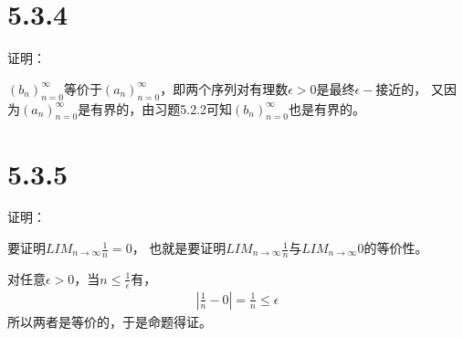 \documentclass{article}
\theoremstyle{mystyle}
\begin{document}
\section*{5.3.4}

证明：

$(b_n)_{n=0}^\infty$等价于$(a_n)_{n=0}^\infty$，即两个序列对有理数$\epsilon > 0$是最终$\epsilon -$接近的，
又因为$(a_n)_{n=0}^\infty$是有界的，由习题5.2.2可知$(b_n)_{n=0}^\infty$也是有界的。


\section*{5.3.5}

证明：

要证明$LIM_{n \rightarrow \infty}\frac{1}{n} = 0$，
也就是要证明$LIM_{n \rightarrow \infty}\frac{1}{n}$与$LIM_{n \rightarrow \infty}0$的等价性。

对任意$\epsilon > 0$，当$n \leq \frac{1}{\epsilon}$有，
\begin{align*}
  |\frac{1}{n} - 0| = \frac{1}{n} \leq \epsilon
\end{align*}
所以两者是等价的，于是命题得证。
\end{document}
